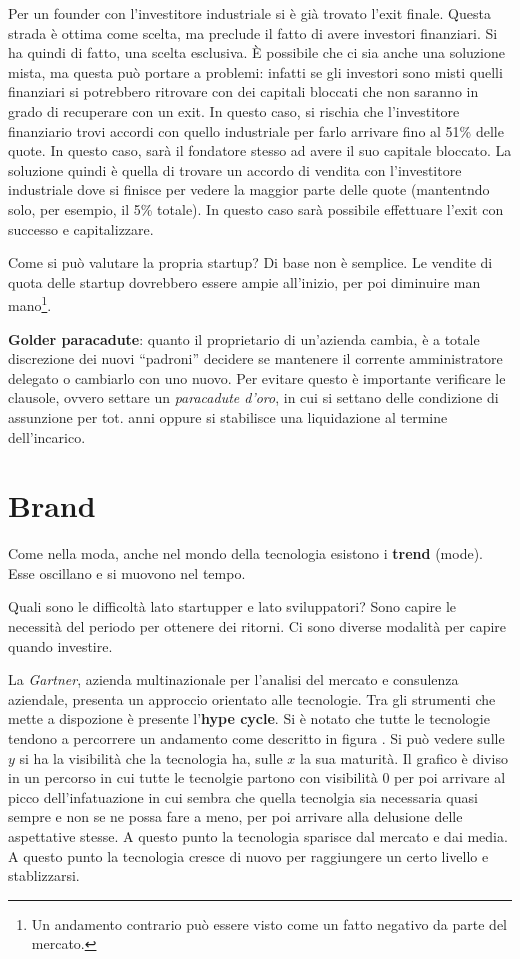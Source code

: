 Per un founder con l'investitore industriale si è già trovato l'exit finale.
Questa strada è ottima come scelta, ma preclude il fatto di avere investori
finanziari. Si ha quindi di fatto, una scelta esclusiva.
È possibile che ci sia anche una soluzione mista, ma questa può portare a
problemi: infatti se gli investori sono misti quelli finanziari si potrebbero
ritrovare con dei capitali bloccati che non saranno in grado di recuperare con
un exit. In questo caso, si rischia che l'investitore finanziario trovi accordi
con quello industriale per farlo arrivare fino al 51\% delle quote. In questo
caso, sarà il fondatore stesso ad avere il suo capitale bloccato. La soluzione
quindi è quella di trovare un accordo di vendita con l'investitore industriale
dove si finisce per vedere la maggior parte delle quote (mantentndo solo, per
esempio, il 5\% totale). In questo caso sarà possibile effettuare l'exit con
successo e capitalizzare.

Come si può valutare la propria startup? Di base non è semplice. Le vendite di
quota delle startup dovrebbero essere ampie all'inizio, per poi diminuire man
mano\footnote{Un andamento contrario può essere visto come un fatto negativo da
parte del mercato.}.

\textbf{Golder paracadute}: quanto il proprietario di un'azienda cambia, è a
totale discrezione dei nuovi ``padroni'' decidere se mantenere il corrente
amministratore delegato o cambiarlo con uno nuovo. Per evitare questo è
importante verificare le clausole, ovvero settare un \textit{paracadute d'oro},
in cui si settano delle condizione di assunzione per tot. anni oppure si
stabilisce una liquidazione al termine dell'incarico.

\chapter{Brand}

Come nella moda, anche nel mondo della tecnologia esistono i \textbf{trend}
(mode). Esse oscillano e si muovono nel tempo.

Quali sono le difficoltà lato startupper e lato sviluppatori? Sono capire le
necessità del periodo per ottenere dei ritorni. Ci sono diverse modalità per
capire quando investire.

La \textit{Gartner}, azienda multinazionale per l'analisi del mercato e
consulenza aziendale, presenta un approccio orientato alle tecnologie. Tra gli
strumenti che mette a dispozione è presente l'\textbf{hype cycle}.
Si è notato che tutte le tecnologie tendono a percorrere un andamento come
descritto in figura .
Si può vedere sulle $y$ si ha la visibilità che la tecnologia ha, sulle $x$ la
sua maturità. Il grafico è diviso in un percorso in cui tutte le tecnolgie
partono con visibilità 0 per poi arrivare al picco dell'infatuazione in cui
sembra che quella tecnolgia sia necessaria quasi sempre e non se ne possa fare
a meno, per poi arrivare alla delusione delle aspettative stesse. A questo
punto la tecnologia sparisce dal mercato e dai media. A questo punto la
tecnologia cresce di nuovo per raggiungere un certo livello e stablizzarsi.

